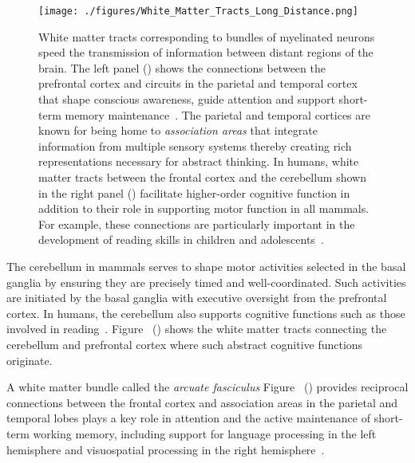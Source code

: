 \begin{figure}
%
  \begin{center} 
    \texttt{[image: ./figures/White\_Matter\_Tracts\_Long\_Distance.png]} %
  \end{center}
%
  \caption{White matter tracts corresponding to bundles of myelinated neurons speed the transmission of information between distant regions of the brain. The left panel ({}) shows the connections between the prefrontal cortex and circuits in the parietal and temporal cortex that shape conscious awareness, guide attention and support short-term memory maintenance~\cite{ChicaetalBSF-18,Dehaene2014}. The parietal and temporal cortices are known for being home to {\it{association areas}} that integrate information from multiple sensory systems thereby creating rich representations necessary for abstract thinking. In humans, white matter tracts between the frontal cortex and the cerebellum {\emdash{}} shown in the right panel ({}) {\emdash{}} facilitate higher-order cognitive function in addition to their role in supporting motor function in all mammals. For example, these connections are particularly important in the development of reading skills in children and adolescents~\cite{TravisetalHBM-15,KozioletalCEREBELLUM-14}.}
%    
  \label{fig_tracts}
%
\end{figure}


The cerebellum in mammals serves to shape motor activities selected in the basal ganglia by ensuring they are precisely timed and well-coordinated. Such activities are initiated by the basal ganglia with executive oversight from the prefrontal cortex. In humans, the cerebellum also supports cognitive functions such as those involved in reading~\cite{TravisetalHBM-15}. Figure~{} ({}) shows the white matter tracts connecting the cerebellum and prefrontal cortex where such abstract cognitive functions originate. 

A white matter bundle called the {\it{arcuate fasciculus}} {\emdash{}} Figure~{} ({}) {\emdash{}} provides reciprocal connections between the frontal cortex and association areas in the parietal and temporal lobes plays a key role in attention and the active maintenance of short-term working memory, including support for language processing in the left hemisphere and visuospatial processing in the right hemisphere~\cite{ChicaetalBSF-18}.

